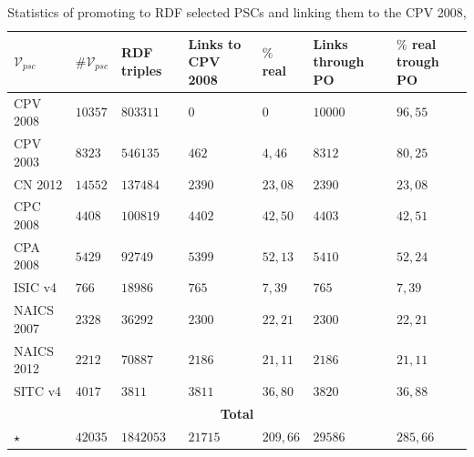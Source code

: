 \begin{table}[!htb]
\scriptsize
\renewcommand{\arraystretch}{1.3}
\begin{center}
\begin{tabular}[c]{|p{2.2cm}|p{1.6cm}|p{1.8cm}|p{1.6cm}|p{1.6cm}|p{1.8cm}|p{1.6cm}|}
 
 \hline
  $\mathcal{V}_{psc}$ & $\#\mathcal{V}_{psc}$  & RDF triples &Links to CPV 2008 &  $\%$ real & Links through PO & $\%$ real trough PO    \\\hline

CPV 2008 	& $10357$  	& $803311$	& $0$	 	& $0$	 	& $10000$	& $96,55$	  \\ \hline
CPV 2003 	& $8323$  	& $546135$	& $462$ 	& $4,46$ 	& $8312$	& $80,25$	 \\ \hline
CN 2012  	& $14552$	& $137484$	& $2390$ 	& $23,08$	& $2390$	& $23,08$	  \\ \hline
CPC 2008 	& $4408$	& $100819$   	& $4402$	& $42,50$	& $4403$	& $42,51$ 	  \\ \hline
CPA 2008 	& $5429$	& $92749$   	& $5399$	& $52,13$	& $5410$	& $52,24$	  \\ \hline
ISIC v4  	& $766$		& $18986$   	& $765$ 	& $7,39$ 	& $765$		& $7,39$	   \\ \hline
NAICS 2007 	& $2328$	& $36292$ 	& $2300$	& $22,21$	& $2300$	& $22,21$	 \\ \hline
NAICS 2012 	& $2212$	& $70887$ 	& $2186$	& $21,11$	& $2186$	& $21,11$	  \\ \hline
SITC v4 	& $4017$	& $3811$   	& $3811$	& $36,80$	& $3820$	& $36,88$	 \\ \hline
\multicolumn{7}{|c|}{\textbf{Total}} \\ \hline
$\star$ 	& $42035$ 	& $1842053$	& $21715$   	& $209,66$	& $29586$ 	& $285,66$	 \\ \hline
\hline
  \end{tabular}
  \caption{Statistics of promoting to RDF selected PSCs and linking them to the CPV 2008,}\label{ganancia-terminos}  
  
  \end{center}
\end{table}



